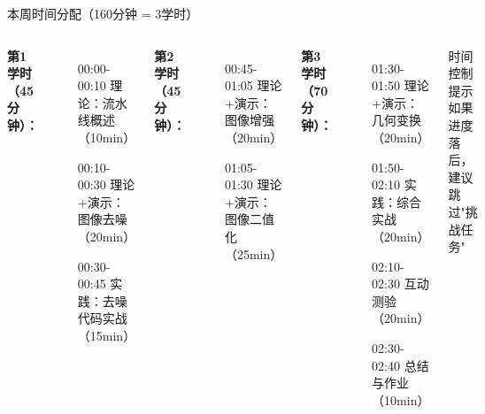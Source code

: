 \documentclass[aspectratio=169, 10pt]{beamer}
\begin{document}
\begin{frame}{本周时间分配（160分钟 = 3学时）}
    \begin{columns}
        \textbf{第1学时（45分钟）：}
        \begin{itemize}
            \item[00:00-00:10] 理论：流水线概述（10min）
            \item[00:10-00:30] 理论+演示：图像去噪（20min）
            \item[00:30-00:45] 实践：去噪代码实战（15min）
        \end{itemize}

        \textbf{第2学时（45分钟）：}
        \begin{itemize}
            \item[00:45-01:05] 理论+演示：图像增强（20min）
            \item[01:05-01:30] 理论+演示：图像二值化（25min）
        \end{itemize}

        \textbf{第3学时（70分钟）：}
        \begin{itemize}
            \item[01:30-01:50] 理论+演示：几何变换（20min）
            \item[01:50-02:10] 实践：综合实战（20min）
            \item[02:10-02:30] 互动测验（20min）
            \item[02:30-02:40] 总结与作业（10min）
        \end{itemize}

        \vspace{0.5cm}
        \begin{alertblock}{时间控制提示}
        如果进度落后，建议跳过"挑战任务"
        \end{alertblock}
    \end{columns}
\end{frame}
\end{document}
